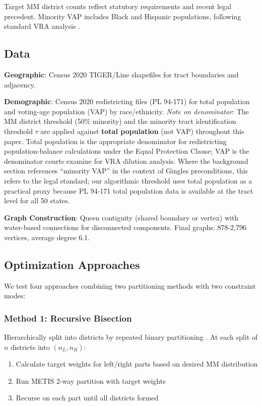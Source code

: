 Target MM district counts reflect statutory requirements and recent legal precedent. Minority VAP includes Black and Hispanic populations, following standard VRA analysis \citep{katz2020}.

\subsection{Data}

\textbf{Geographic}: Census 2020 TIGER/Line shapefiles for tract boundaries and adjacency.

\textbf{Demographic}: Census 2020 redistricting files (PL 94-171) for total population and voting-age population (VAP) by race/ethnicity. \emph{Note on denominator}: The MM district threshold (50\% minority) and the minority tract identification threshold $\tau$ are applied against \textbf{total population} (not VAP) throughout this paper. Total population is the appropriate denominator for redistricting population-balance calculations under the Equal Protection Clause; VAP is the denominator courts examine for VRA dilution analysis. Where the background section references ``minority VAP'' in the context of Gingles preconditions, this refers to the legal standard; our algorithmic threshold uses total population as a practical proxy because PL 94-171 total population data is available at the tract level for all 50 states.

\textbf{Graph Construction}: Queen contiguity (shared boundary or vertex) with water-based connections for disconnected components. Final graphs: 878-2,796 vertices, average degree 6.1.

\subsection{Optimization Approaches}

We test four approaches combining two partitioning methods with two constraint modes:

\subsubsection{Method 1: Recursive Bisection}

Hierarchically split into districts by repeated binary partitioning \citep{dellaLibera2026recursive}. At each split of $n$ districts into $(n_L, n_R)$:

\begin{enumerate}
\item Calculate target weights for left/right parts based on desired MM distribution
\item Run METIS 2-way partition with target weights
\item Recurse on each part until all districts formed
\end{enumerate}


